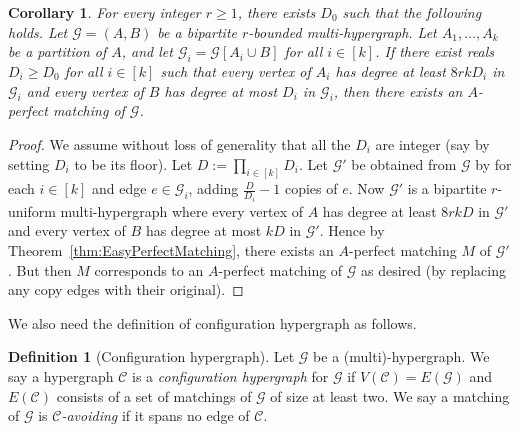 \documentclass[11pt]{article}
\numberwithin{equation}{section}
\newcounter{i}
\theoremstyle{plain}
\newtheorem{cor}[thm]{Corollary}
\theoremstyle{plain} %
\theoremstyle{definition}
\newtheorem{definition}[thm]{Definition}
\newcommand{\cC}{\mathcal{C}}
\newcommand{\cG}{\mathcal{G}}
\begin{document}
\begin{cor}\label{cor:EasyPerfectMatching}
For every integer $r \geq 1$, there exists $D_0$ such that the following holds.
Let $\cG=(A,B)$ be a bipartite $r$-bounded multi-hypergraph. Let $A_1,\ldots, A_k$ be a partition of $A$, and let $\cG_i=\cG[A_i\cup B]$ for all $i\in [k]$. If there exist reals $D_i\ge D_0$ for all $i\in [k]$ such that every vertex of $A_i$ has degree at least $8rkD_i$ in $\cG_i$ and every vertex of $B$ has degree at most $D_i$ in $\cG_i$, then there exists an $A$-perfect matching of $\cG$.
\end{cor}
\begin{proof}
We assume without loss of generality that all the $D_i$ are integer (say by setting $D_i$ to be its floor). Let $D:= \prod_{i\in [k]} D_i$. Let $\cG'$ be obtained from $\cG$ by for each $i\in [k]$ and edge $e\in \cG_i$, adding $\frac{D}{D_i} - 1$ copies of $e$. Now $\cG'$ is a bipartite $r$-uniform multi-hypergraph where every vertex of $A$ has degree at least $8rkD$ in $\cG'$ and every vertex of $B$ has degree at most $kD$ in $\cG'$. 
Hence by Theorem~\ref{thm:EasyPerfectMatching}, there exists an $A$-perfect matching $M$ of $\cG'$. But then $M$ corresponds to an $A$-perfect matching of $\cG$ as desired (by replacing any copy edges with their original).   
\end{proof}


We also need the definition of configuration hypergraph as follows.


\begin{definition}[Configuration hypergraph]\label{def:configuration-hypergraph}
    Let $\cG$ be a (multi)-hypergraph. We say a hypergraph $\cC$ is
a \textit{configuration hypergraph} for $\cG$ if $V(\cC) = E(\cG)$ and $E(\cC)$ consists of a set of matchings of $\cG$ of size at
least two. We say a matching of $\cG$ is \textit{$\cC$-avoiding} if it spans no edge of $\cC$.
\end{definition}
\end{document}
